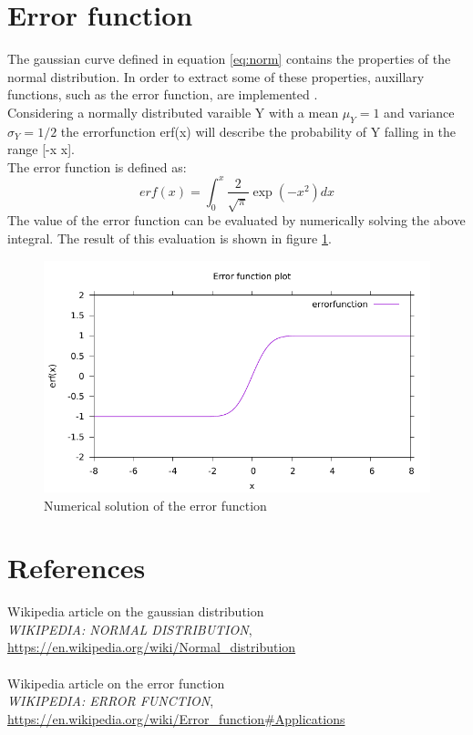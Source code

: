 \documentclass{article}
\begin{document}
\section{Error function}
The gaussian curve defined in equation \ref{eq:norm} contains the properties of the normal distribution. In order to extract some of these
properties, auxillary functions, such as the error function, are implemented \cite{wikierf}.
\\
Considering a normally distributed varaible Y with a mean $\mu_Y=1$ and variance $\sigma_Y=1/2$ the errorfunction erf(x) 
will describe the probability of Y falling in the range [-x x].
\\
The error function is defined as:
\begin{equation}
erf(x)=\int_{0}^{x} \frac{2}{\sqrt{\pi}} \exp(-x^2) dx
\end{equation}   
The value of the error function can be evaluated by numerically solving the above integral. The result of this 
evaluation is shown in figure \ref{fig:erf}.

\begin{figure}[h]
\label{fig:erf}
\includegraphics{final.pdf}
\caption{Numerical solution of the error function}
\end{figure}

\clearpage
\section{References}
\begin{thebibliography}{99}
  Wikipedia article on the gaussian distribution\\
  \emph{WIKIPEDIA: NORMAL DISTRIBUTION},\\
 \url{https://en.wikipedia.org/wiki/Normal_distribution}\\
\\
  Wikipedia article on the error function\\
  \emph{WIKIPEDIA: ERROR FUNCTION},\\
 \url{https://en.wikipedia.org/wiki/Error_function#Applications}\\

\end{thebibliography}
\end{document}
